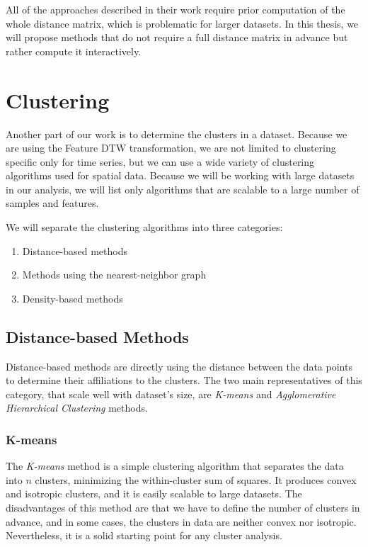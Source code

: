 All of the approaches described in their work require prior computation of the whole distance matrix, which is problematic for larger datasets. In this thesis, we will propose methods that do not require a full distance matrix in advance but rather compute it interactively.

\section{Clustering}
Another part of our work is to determine the clusters in a dataset. Because we are using the Feature DTW transformation, we are not limited to clustering specific only for time series, but we can use a wide variety of clustering algorithms used for spatial data. Because we will be working with large datasets in our analysis, we will list only algorithms that are scalable to a large number of samples and features.

We will separate the clustering algorithms into three categories:
\begin{enumerate}
    \item Distance-based methods
    \item Methods using the nearest-neighbor graph
    \item Density-based methods
\end{enumerate}

\subsection{Distance-based Methods}
Distance-based methods are directly using the distance between the data points to determine their affiliations to the clusters. The two main representatives of this category, that scale well  with dataset's size, are \textit{K-means} and \textit{Agglomerative Hierarchical Clustering} methods.

\subsubsection{K-means}
The \textit{K-means} method \cite{vis:kmeans} is a simple clustering algorithm that separates the data into $n$ clusters, minimizing the within-cluster sum of squares. It produces convex and isotropic clusters, and it is easily scalable to large datasets. The disadvantages of this method are that we have to define the number of clusters in advance, and in some cases, the clusters in data are neither convex nor isotropic. Nevertheless,  it is a solid starting point for any cluster analysis. 

